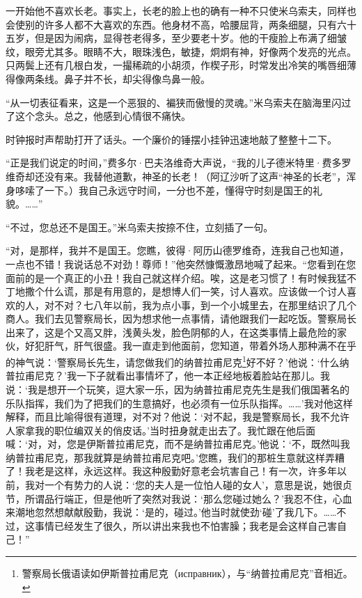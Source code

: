 \par 一开始他不喜欢长老。事实上，长老的脸上也的确有一种不只使米乌索夫，同样也会使别的许多人都不大喜欢的东西。他身材不高，哈腰屈背，两条细腿，只有六十五岁，但是因为闹病，显得苍老得多，至少要老十岁。他的干瘦脸上布满了细皱纹，眼旁尤其多。眼睛不大，眼珠浅色，敏捷，炯炯有神，好像两个发亮的光点。只两鬓上还有几根白发，一撮稀疏的小胡须，作楔子形，时常发出冷笑的嘴唇细薄得像两条线。鼻子并不长，却尖得像鸟鼻一般。
\par “从一切表征看来，这是一个恶狠的、褊狭而傲慢的灵魂。”米乌索夫在脑海里闪过了这个念头。总之，他感到心情很不痛快。
\par 时钟报时声帮助打开了话头。一个廉价的锤摆小挂钟迅速地敲了整整十二下。
\par “正是我们说定的时间，”费多尔·巴夫洛维奇大声说，“我的儿子德米特里·费多罗维奇却还没有来。我替他道歉，神圣的长老！（阿辽沙听了这声“神圣的长老”，浑身哆嗦了一下。）我自己永远守时间，一分也不差，懂得守时刻是国王的礼貌。……”
\par “不过，您总还不是国王。”米乌索夫按捺不住，立刻插了一句。
\par “对，是那样，我并不是国王。您瞧，彼得·阿历山德罗维奇，连我自己也知道，一点也不错！我说话总不对劲！尊师！”他突然慷慨激昂地喊了起来。“您看到在您面前的是一个真正的小丑！我自己就这样介绍。唉，这是老习惯了！有时候我猛不丁地撒个什么谎，那是有用意的，是想博人们一笑，讨人喜欢。应该做一个讨人喜欢的人，对不对？七八年以前，我为点小事，到一个小城里去，在那里结识了几个商人。我们去见警察局长，因为想求他一点事情，请他跟我们一起吃饭。警察局长出来了，这是个又高又胖，浅黄头发，脸色阴郁的人，在这类事情上最危险的家伙，好犯肝气，肝气很盛。我一直走到他面前，您知道，带着外场人那种满不在乎的神气说：‘警察局长先生，请您做我们的纳普拉甫尼克\footnote{警察局长俄语读如伊斯普拉甫尼克（исправник），与“纳普拉甫尼克”音相近。}好不好？’他说：‘什么纳普拉甫尼克？’我一下子就看出事情坏了，他一本正经地板着脸站在那儿。我说：‘我是想开一个玩笑，逗大家一乐，因为纳普拉甫尼克先生是我们俄国著名的乐队指挥，我们为了把我们的生意搞好，也必须有一位乐队指挥。……’我对他这样解释，而且比喻得很有道理，对不对？他说：‘对不起，我是警察局长，我不允许人家拿我的职位编双关的俏皮话。’当时扭身就走出去了。我忙跟在他后面喊：‘对，对，您是伊斯普拉甫尼克，而不是纳普拉甫尼克。’他说：‘不，既然叫我纳普拉甫尼克，那我就算是纳普拉甫尼克吧。’您瞧，我们的那桩生意就这样弄糟了！我老是这样，永远这样。我这种殷勤好意老会坑害自己！有一次，许多年以前，我对一个有势力的人说：‘您的夫人是一位怕人碰的女人’，意思是说，她很贞节，所谓品行端正，但是他听了突然对我说：‘那么您碰过她么？’我忍不住，心血来潮地忽然想献献殷勤，我说：‘是的，碰过。’他当时就使劲‘碰’了我几下。……不过，这事情已经发生了很久，所以讲出来我也不怕害臊；我老是会这样自己害自己！”
